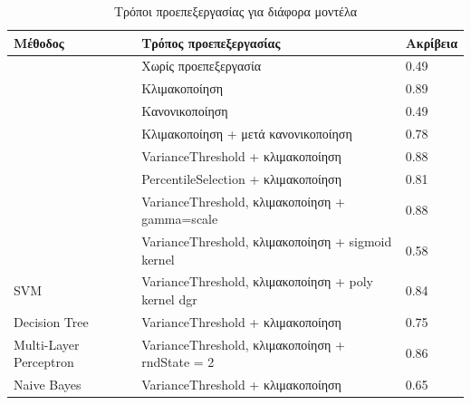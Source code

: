 \begin{table}[H]
\begin{tabular}{|l|l|l|}
\hline
\textbf{Μέθοδος}       & \textbf{Τρόπος προεπεξεργασίας}                                             & \textbf{Ακρίβεια}            \\ \hline
                       & Χωρίς προεπεξεργασία                                                        & 0.49                         \\ \cline{2-3} 
                       & Κλιμακοποίηση                                                               & 0.89                         \\ \cline{2-3} 
                       & Κανονικοποίηση                                                              & 0.49                         \\ \cline{2-3} 
                       & Κλιμακοποίηση + μετά κανονικοποίηση                                         & 0.78                         \\ \cline{2-3} 
                       & VarianceThreshold + κλιμακοποίηση                                           & 0.88                         \\ \cline{2-3} 
                       & PercentileSelection + κλιμακοποίηση                                         & 0.81                         \\ \cline{2-3} 
                       & VarianceThreshold,  κλιμακοποίηση + gamma=scale                             & 0.88                         \\ \cline{2-3} 
                       & VarianceThreshold,  κλιμακοποίηση + sigmoid kernel                          & 0.58                         \\ \cline{2-3} 
\multirow{-9}{*}{SVM}  & VarianceThreshold,  κλιμακοποίηση + poly kernel dgr                         & 0.84                         \\ \hline
Decision Tree          & VarianceThreshold + κλιμακοποίηση                                           & 0.75                         \\ \hline
Multi-Layer Perceptron & VarianceThreshold, κλιμακοποίηση + rndState = 2                             & 0.86                         \\ \hline
Naive Bayes            & VarianceThreshold + κλιμακοποίηση                                           & 0.65                         \\ \hline
\end{tabular}
\caption{Τρόποι προεπεξεργασίας για διάφορα μοντέλα}
\label{table:tab}
\end{table}

